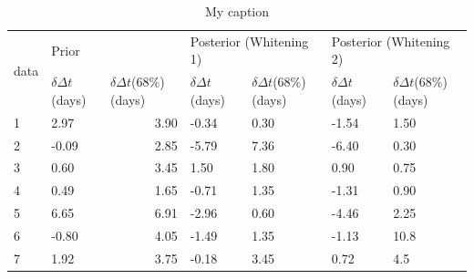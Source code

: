 \documentclass[\docopts]{\docclass}
\begin{document}
\begin{table}[]
\centering
\caption{My caption}
\label{tab:summary}
\begin{tabular}{|l|l|r|l|l|l|l|}
\hline
\multicolumn{1}{|c|}{\multirow{2}{*}{data}} & \multicolumn{2}{l|}{Prior}                                                    & \multicolumn{2}{l|}{Posterior (Whitening 1)}              & \multicolumn{2}{l|}{Posterior (Whitening 2)}              \\ \cline{2-7} 
\multicolumn{1}{|c|}{}                      & $\delta\Delta t$(days) & \multicolumn{1}{l|}{$\delta\Delta t$(68$\%$) (days)} & $\delta\Delta t$ (days) & $\delta\Delta t$(68$\%$) (days) & $\delta\Delta t$ (days) & $\delta\Delta t$(68$\%$) (days) \\ \hline
1                                           & 2.97                   & 3.90                                                 & -0.34                   & 0.30                            & -1.54                   & 1.50                            \\ \hline
2                                           & -0.09                  & 2.85                                                 & -5.79                   & 7.36                            & -6.40                   & 0.30                            \\ \hline
3                                           & 0.60                   & 3.45                                                 & 1.50                    & 1.80                            & 0.90                    & 0.75                            \\ \hline
4                                           & 0.49                   & 1.65                                                 & -0.71                   & 1.35                            & -1.31                   & 0.90                            \\ \hline
5                                           & 6.65                   & 6.91                                                 & -2.96                   & 0.60                            & -4.46                   & 2.25                            \\ \hline
6                                           & -0.80                  & 4.05                                                 & -1.49                   & 1.35                            & -1.13                   & 10.8                            \\ \hline
7                                           & 1.92                   & 3.75                                                 & -0.18                   & 3.45                            & 0.72                    & 4.5                             \\ \hline

\end{tabular}
\end{table}
\end{document}
